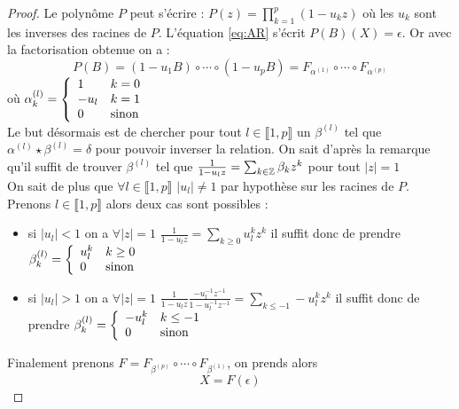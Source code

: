 \documentclass{report}
\begin{document}
\begin{proof}
Le polynôme $P$ peut s'écrire : $P(z)=\prod_{k=1}^p (1-u_k z)$ où les $u_k$ sont les inverses des racines de $P$. L'équation \eqref{eq:AR} s'écrit $P(B)(X)=\epsilon$. Or avec la factorisation obtenue on a : 
\[
P(B) = (1-u_1 B) \circ \cdots \circ (1-u_p B) = F_{\alpha^{(1)}} \circ \cdots \circ F_{\alpha^{(p)}}
\]
où $\alpha_k^{(l)} = { \left\lbrace \begin{array}{ll} 
1 & k=0 \\
-u_l & k=1 \\
0 & \text{sinon} \\ \end{array} \right. }
$ \\
Le but désormais est de chercher pour tout $l \in \llbracket 1, p \rrbracket$ un $\beta^{(l)}$ tel que $\alpha^{(l)} \star \beta^{(l)} = \delta$ pour pouvoir inverser la relation. On sait d'après la remarque qu'il suffit de trouver $\beta^{(l)}$ tel que $\frac{1}{1-u_l z} = \sum_{k \in \mathbb{Z}} \beta_k z^k$ pour tout $|z|=1$ \\
On sait de plus que $\forall l \in \llbracket 1, p \rrbracket$ $|u_l| \neq 1$ par hypothèse sur les racines de $P$.\\
Prenons $l\in \llbracket 1,p \rrbracket$ alors deux cas sont possibles :
\begin{itemize}
\item si $|u_l|< 1$ on a $\forall |z|=1$ $\frac{1}{1-u_l z} = \sum_{k \geq 0} u_l^k z^k$ il suffit donc de prendre $\beta_k^{(l)} = { \left\lbrace \begin{array}{ll} 
u_l^k & k \geq 0 \\
0 & \text{sinon} \\
 \end{array} \right. }$
\item si $|u_l|> 1$ on a $\forall |z|=1$ $\frac{1}{1-u_l z} \frac{-u_l^{-1} z^{-1}}{1-u_l^{-1} z^{-1}} = \sum_{k \leq -1} -u_l^k z^k$ il suffit donc de prendre $\beta_k^{(l)} = { \left\lbrace \begin{array}{ll} 
-u_l^k & k \leq -1 \\
0 & \text{sinon} \\
 \end{array} \right. }$
\end{itemize}
Finalement prenons $F = F_{\beta^{(p)}} \circ \cdots \circ F_{\beta^{(1)}}$, on prends alors 
\[
X = F(\epsilon) 
\]
\end{proof}
\end{document}

